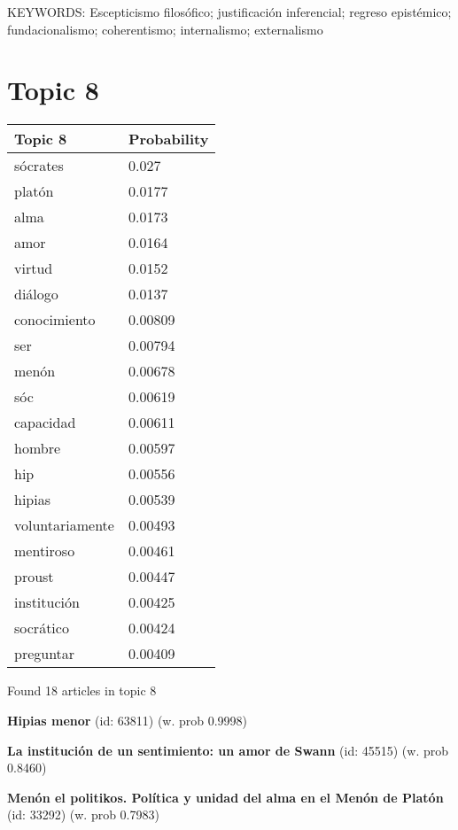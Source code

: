 \documentclass{article}
\begin{document}
KEYWORDS:
Escepticismo filosófico; justificación inferencial; regreso epistémico; fundacionalismo; coherentismo; internalismo; externalismo

\vfill
\newpage


\centering
\thispagestyle{empty}
\section*{Topic 8}\vfill
\begin{tabular}{ll}
\toprule
         Topic 8 & Probability \\
\midrule
        sócrates &       0.027 \\
          platón &      0.0177 \\
            alma &      0.0173 \\
            amor &      0.0164 \\
          virtud &      0.0152 \\
         diálogo &      0.0137 \\
    conocimiento &     0.00809 \\
             ser &     0.00794 \\
           menón &     0.00678 \\
             sóc &     0.00619 \\
       capacidad &     0.00611 \\
          hombre &     0.00597 \\
             hip &     0.00556 \\
          hipias &     0.00539 \\
 voluntariamente &     0.00493 \\
       mentiroso &     0.00461 \\
          proust &     0.00447 \\
     institución &     0.00425 \\
       socrático &     0.00424 \\
       preguntar &     0.00409 \\
\bottomrule
\end{tabular}

\vfill
Found 18 articles in topic 8
\vfill

\textbf{Hipias menor} (id: 63811)
 (w. prob 0.9998)
\vfill

\textbf{La institución de un sentimiento: un amor de Swann} (id: 45515)
 (w. prob 0.8460)
\vfill

\textbf{Menón el politikos. Política y unidad del alma en el Menón de Platón} (id: 33292)
 (w. prob 0.7983)
\end{document}

